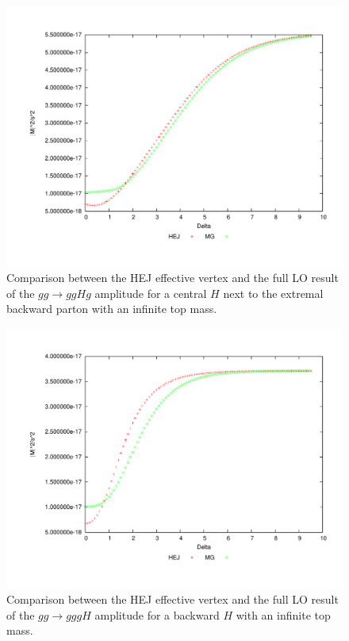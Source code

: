 \begin{figure}[t]
\centering
\includegraphics[scale=0.45]{Images/gg_cen2.pdf}
\caption{Comparison between the HEJ effective vertex and the full LO result of the $gg \to ggHg$ amplitude for a central $H$ next to the extremal backward parton with an infinite top mass.}
\label{fig:gg_ggh_3}
\end{figure}


\begin{figure}[t]
\centering
\includegraphics[scale=0.45]{Images/gg_nextback.pdf}
\caption{Comparison between the HEJ effective vertex and the full LO result of the $gg \to gggH$ amplitude for a backward $H$ with an infinite top mass.}
\label{fig:gg_ggh_4}
\end{figure}

